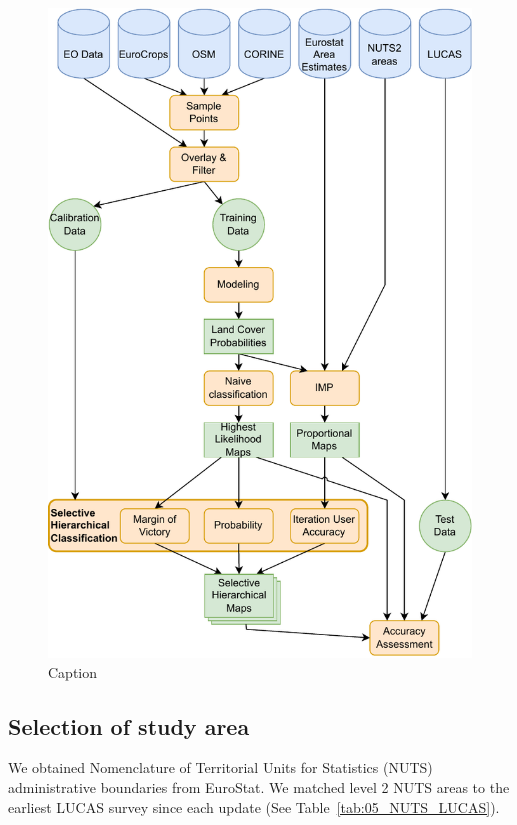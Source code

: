 \begin{figure}[H]
    \centering
    \includegraphics[width=\textwidth]{figs_05/fig_methodology.pdf}
    \caption{Caption}
    \label{fig:05_methodology}
\end{figure}

\subsection{Selection of study area}

We obtained Nomenclature of Territorial Units for Statistics (NUTS) administrative boundaries from EuroStat. %
We matched level 2 NUTS areas to the earliest LUCAS survey since each update (See Table~\ref{tab:05_NUTS_LUCAS}). 

